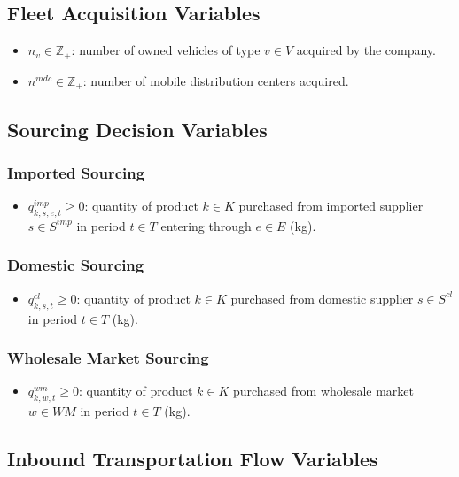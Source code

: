 \documentclass[12pt]{article}
\begin{document}
\subsection{Fleet Acquisition Variables}
\begin{itemize}
    \item $n_v \in \mathbb{Z}_{+}$: number of owned vehicles of type $v \in V$ acquired by the company.

    \item $n^{mdc} \in \mathbb{Z}_{+}$: number of mobile distribution centers acquired.
\end{itemize}

\subsection{Sourcing Decision Variables}

\subsubsection{Imported Sourcing}
\begin{itemize}
    \item $q^{imp}_{k,s,e,t} \geq 0$: quantity of product $k \in K$ purchased from imported supplier $s \in S^{imp}$ in period $t \in T$ entering through $e \in E$ (kg).
\end{itemize}

\subsubsection{Domestic Sourcing}
\begin{itemize}
    \item $q^{cl}_{k,s,t} \geq 0$: quantity of product $k \in K$ purchased from domestic supplier $s \in S^{cl}$ in period $t \in T$ (kg).
\end{itemize}

\subsubsection{Wholesale Market Sourcing}
\begin{itemize}
    \item $q^{wm}_{k,w,t} \geq 0$: quantity of product $k \in K$ purchased from wholesale market $w \in WM$ in period $t \in T$ (kg).
\end{itemize}

\subsection{Inbound Transportation Flow Variables}
\end{document}
